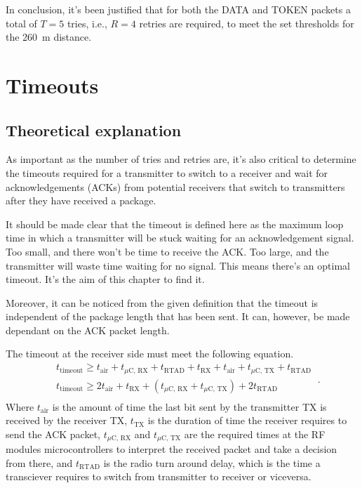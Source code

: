 In conclusion, it's been justified that for both the DATA and TOKEN packets a total of $T=5$ tries, i.e., $R=4$ retries are required, to meet the set thresholds for the \SI{260}{\m} distance.









\chapter{Timeouts}

\section{Theoretical explanation}
As important as the number of tries and retries are, it's also critical to determine the timeouts required for a transmitter to switch to a receiver and wait for acknowledgements (ACKs) from potential receivers that switch to transmitters after they have received a package.

It should be made clear that the timeout is defined here as the maximum loop time in which a transmitter will be stuck waiting for an acknowledgement signal. Too small, and there won't be time to receive the ACK. Too large, and the transmitter will waste time waiting for no signal. This means there's an optimal timeout. It's the aim of this chapter to find it. 

Moreover, it can be noticed from the given definition that the timeout is independent of the package length that has been sent. It can, however, be made dependant on the ACK packet length.

The timeout at the receiver side must meet the following equation.
\begin{equation}
	\begin{split}
	& t_{\text{timeout}} \geq t_{\text{air}} + t_{\mu \text{C, RX}} + t_{\text{RTAD}} + t_{\text{RX}} + t_{\text{air}} + t_{\mu \text{C, TX}} + t_{\text{RTAD}}  \\
	& t_{\text{timeout}} \geq 2 t_{\text{air}} + t_{\text{RX}} + \left(  t_{\mu \text{C, RX}} + t_{\mu \text{C, TX}} \right) +  2 t_{\text{RTAD}}  \\
	\end{split} \ .
	\label{eq:timeout}
\end{equation}
Where $t_{\text{air}}$ is the amount of time the last bit sent by the transmitter TX is received by the receiver TX, $t_{\text{TX}}$ is the duration of time the receiver requires to send the ACK packet, $t_{\mu \text{C, RX}}$ and $t_{\mu \text{C, TX}}$ are the required times at the RF modules microcontrollers to interpret the received packet and take a decision from there, and $t_{\text{RTAD}}$ is the radio turn around delay, which is the time a transciever requires to switch from transmitter to receiver or viceversa.


